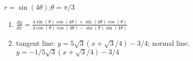 {$r=\sin(4\theta)$;\quad $\theta = \pi/3$}
{\begin{enumerate}
	\item $\frac{dy}{dx} = \frac{4 \sin (\theta) \cos (4 \theta)+\sin (4 \theta) \cos (\theta)}{4 \cos (\theta) \cos
   (4 \theta)-\sin (\theta) \sin (4 \theta)}$
	\item	tangent line: $y=5\sqrt{3}(x+\sqrt{3}/4)-3/4$; normal line: $y=-1/5\sqrt{3}(x+\sqrt{3}/4)-3/4$
\end{enumerate}}

